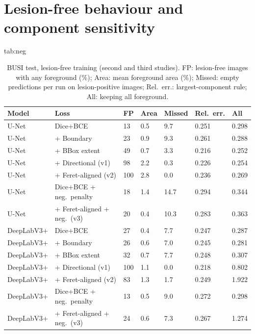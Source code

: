 \documentclass{midl}
\begin{document}
\section{Lesion-free behaviour and component sensitivity}\label{app:neg}
\begin{table}[htbp]
\floatconts
  {tab:neg}
  {\caption{BUSI test, lesion-free training (second and third studies). FP: lesion-free images with any foreground (\%); Area: mean foreground area (\%); Missed: empty predictions per run on lesion-positive images; Rel.\ err.: largest-component rule; All: keeping all foreground.}}
  {\small\begin{tabular}{lllllll}
  \toprule
  Model & Loss & FP & Area & Missed & Rel.\ err. & All\\
  \midrule
  U-Net & Dice+BCE & 13 & 0.5 & 9.7 & 0.251 & 0.298 \\
U-Net & + Boundary & 23 & 0.9 & 9.3 & 0.261 & 0.288 \\
U-Net & + BBox extent & 49 & 0.7 & 3.3 & 0.216 & 0.252 \\
U-Net & + Directional (v1) & 98 & 2.2 & 0.3 & 0.226 & 0.254 \\
U-Net & + Feret-aligned (v2) & 100 & 2.8 & 0.0 & 0.236 & 0.269 \\
U-Net & Dice+BCE + neg.\ penalty & 18 & 1.4 & 14.7 & 0.294 & 0.344 \\
U-Net & + Feret-aligned + neg.\ (v3) & 20 & 0.4 & 10.3 & 0.283 & 0.363 \\
DeepLabV3+ & Dice+BCE & 27 & 0.4 & 7.7 & 0.247 & 0.287 \\
DeepLabV3+ & + Boundary & 26 & 0.6 & 7.0 & 0.245 & 0.281 \\
DeepLabV3+ & + BBox extent & 32 & 0.7 & 7.7 & 0.248 & 0.307 \\
DeepLabV3+ & + Directional (v1) & 100 & 1.1 & 0.0 & 0.218 & 0.802 \\
DeepLabV3+ & + Feret-aligned (v2) & 83 & 1.3 & 1.7 & 0.249 & 1.922 \\
DeepLabV3+ & Dice+BCE + neg.\ penalty & 13 & 0.5 & 9.0 & 0.272 & 0.298 \\
DeepLabV3+ & + Feret-aligned + neg.\ (v3) & 24 & 0.6 & 7.3 & 0.267 & 1.274 \\
  \bottomrule
  \end{tabular}}
\end{table}
\end{document}
